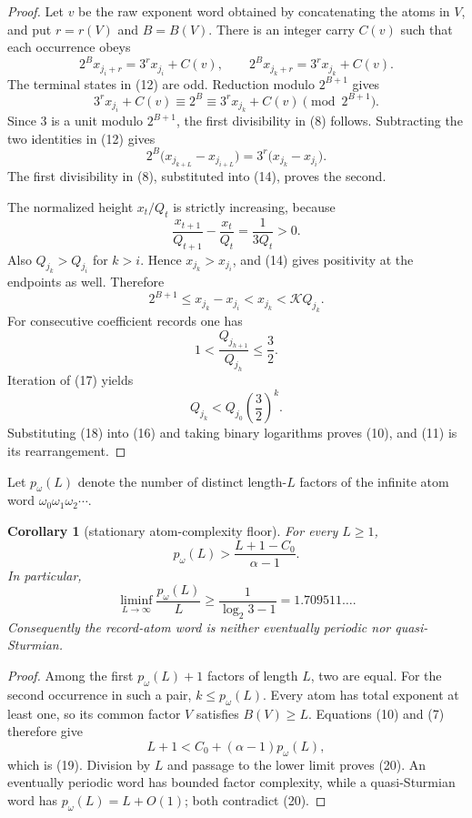 \documentclass[11pt]{article}
\newtheorem{corollary}[theorem]{Corollary}
\begin{document}
\begin{proof}
Let $v$ be the raw exponent word obtained by concatenating the atoms in
$V$, and put $r=r(V)$ and $B=B(V)$.  There is an integer carry $C(v)$
such that each occurrence obeys
\[
 2^B x_{j_i+r}=3^r x_{j_i}+C(v),
 \qquad
 2^B x_{j_k+r}=3^r x_{j_k}+C(v).
 \tag{12}
\]
The terminal states in (12) are odd.  Reduction modulo $2^{B+1}$ gives
\[
 3^r x_{j_i}+C(v)\equiv2^B
 \equiv3^r x_{j_k}+C(v)\pmod {2^{B+1}}.
 \tag{13}
\]
Since $3$ is a unit modulo $2^{B+1}$, the first divisibility in (8)
follows.  Subtracting the two identities in (12) gives
\[
 2^B\bigl(x_{j_{k+L}}-x_{j_{i+L}}\bigr)
 =3^r\bigl(x_{j_k}-x_{j_i}\bigr).
 \tag{14}
\]
The first divisibility in (8), substituted into (14), proves the second.

The normalized height $x_t/Q_t$ is strictly increasing, because
\[
 \frac{x_{t+1}}{Q_{t+1}}-
 \frac{x_t}{Q_t}=\frac1{3Q_t}>0.
 \tag{15}
\]
Also $Q_{j_k}>Q_{j_i}$ for $k>i$.  Hence
$x_{j_k}>x_{j_i}$, and (14) gives positivity at the endpoints as well.
Therefore
\[
 2^{B+1}
 \leq x_{j_k}-x_{j_i}
 <x_{j_k}
 <\mathcal KQ_{j_k}.
 \tag{16}
\]
For consecutive coefficient records one has
\[
 1<\frac{Q_{j_{h+1}}}{Q_{j_h}}\leq\frac32.
 \tag{17}
\]
Iteration of (17) yields
\[
 Q_{j_k}<Q_{j_0}\left(\frac32\right)^k.
 \tag{18}
\]
Substituting (18) into (16) and taking binary logarithms proves (10),
and (11) is its rearrangement.
\end{proof}

Let $p_{\omega}(L)$ denote the number of distinct length-$L$ factors of
the infinite atom word $\omega_0\omega_1\omega_2\cdots$.

\begin{corollary}[stationary atom-complexity floor]
For every $L\geq1$,
\[
\boxed{
 p_{\omega}(L)>
 \frac{L+1-C_0}{\alpha-1}.}
\tag{19}
\]
In particular,
\[
\boxed{
 \liminf_{L\to\infty}\frac{p_{\omega}(L)}L
 \geq\frac1{\log_2 3-1}
 =1.709511\ldots .}
\tag{20}
\]
Consequently the record-atom word is neither eventually periodic nor
quasi-Sturmian.
\end{corollary}

\begin{proof}
Among the first $p_{\omega}(L)+1$ factors of length $L$, two are equal.
For the second occurrence in such a pair, $k\leq p_{\omega}(L)$.  Every
atom has total exponent at least one, so its common factor $V$ satisfies
$B(V)\geq L$.  Equations (10) and (7) therefore give
\[
 L+1<C_0+(\alpha-1)p_{\omega}(L),
\]
which is (19).  Division by $L$ and passage to the lower limit proves
(20).  An eventually periodic word has bounded factor complexity, while a
quasi-Sturmian word has $p_{\omega}(L)=L+O(1)$; both contradict (20).
\end{proof}
\end{document}
